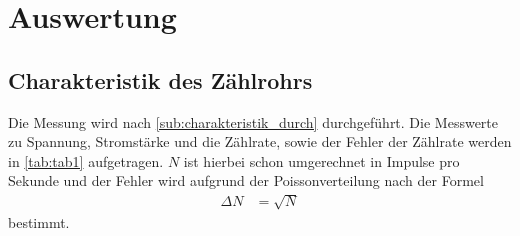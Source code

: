 \section{Auswertung}
\label{sec:Auswertung}
\subsection{Charakteristik des Zählrohrs} %
\label{sub:charakteristik_aus}

Die Messung wird nach \autoref{sub:charakteristik_durch} durchgeführt. Die Messwerte zu Spannung, Stromstärke und die Zählrate, sowie der Fehler
der Zählrate werden in
\autoref{tab:tab1} aufgetragen.
$N$ ist hierbei schon umgerechnet in Impulse pro Sekunde und der Fehler wird aufgrund der Poissonverteilung nach der Formel
\begin{align*}
  \Delta N &= \sqrt{N} 
\end{align*}
bestimmt.
